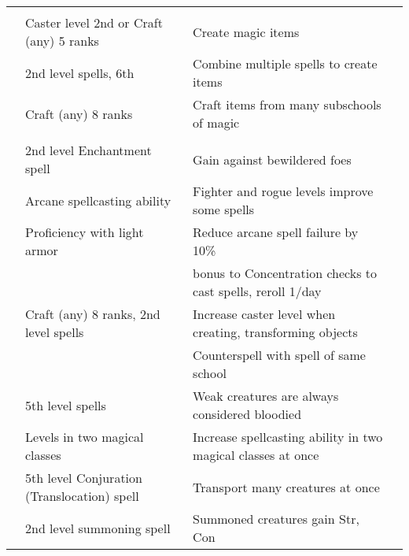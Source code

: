{\begin{longtabu}{>{\lcol}p{10em} >{\lcol}p{15em} >{\lcol}X >{\lcol}p{3em}}
    \midrule
     &  &  &  \\
     & Caster level 2nd or Craft (any) 5 ranks & Create magic items &  \\
     & 2nd level spells, 6th & Combine multiple spells to create items &  \\
     & Craft (any) 8 ranks & Craft items from many subschools of magic &  \\

    \midrule
     &  &  &  \\
     & 2nd level Enchantment spell & Gain  against bewildered foes &  \\
     & Arcane spellcasting ability & Fighter and rogue levels improve some spells &  \\
     & Proficiency with light armor & Reduce arcane spell failure by 10\% &  \\
     & \x &   bonus to Concentration checks to cast spells, reroll 1/day &  \\
     & Craft (any) 8 ranks, 2nd level spells & Increase caster level when creating, transforming objects &  \\
     & \x &  Counterspell with spell of same school &  \\
     & 5th level spells & Weak creatures are always considered bloodied &  \\
     & Levels in two magical classes & Increase spellcasting ability in two magical classes at once &  \\
     & 5th level Conjuration (Translocation) spell & Transport many creatures at once &  \\
     & 2nd level summoning spell & Summoned creatures gain  Str,  Con &  \\

\end{longtabu}}
